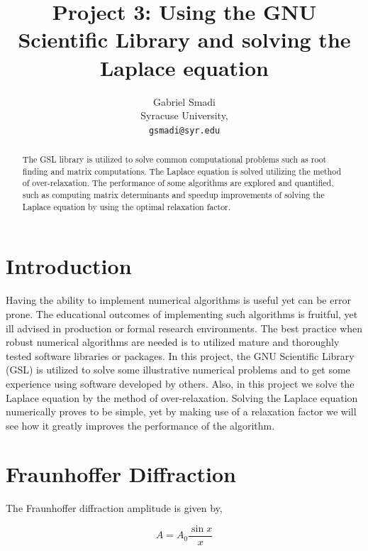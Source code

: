 \documentclass{article}
\begin{document}
\title{Project 3: Using the GNU Scientific Library and solving the Laplace equation }

\author{Gabriel Smadi\\
  Syracuse University,\\
  \texttt{gsmadi@syr.edu}}
\maketitle

\begin{abstract}
The GSL library is utilized to solve common computational problems such as root finding
and matrix computations. The Laplace equation is solved utilizing the method of over-relaxation.
The performance of some algorithms are explored and quantified, such as computing matrix determinants
and speedup improvements of solving the Laplace equation by using the optimal relaxation factor.
\end{abstract}

\section{Introduction}

Having the ability to implement numerical algorithms is useful yet can be error prone. The educational outcomes of implementing
such algorithms is fruitful, yet ill advised in production or formal research environments. The best practice when robust numerical
algorithms are needed is to utilized mature and thoroughly tested software libraries or packages. In this project, the GNU
Scientific Library (GSL) is utilized to solve some illustrative numerical problems and to get some experience using software
developed by others. Also, in this project we solve the Laplace equation by the method of over-relaxation. Solving the
Laplace equation numerically proves to be simple, yet by making use of a relaxation factor we will see how it greatly improves the
performance of the algorithm.

\section{Fraunhoffer Diffraction}

The Fraunhoffer diffraction amplitude is given by,

\begin{equation}
\label{eq:fraun_amp}
  A = A_{0}\frac{\sin{x}}{x}
\end{equation}
\end{document}
